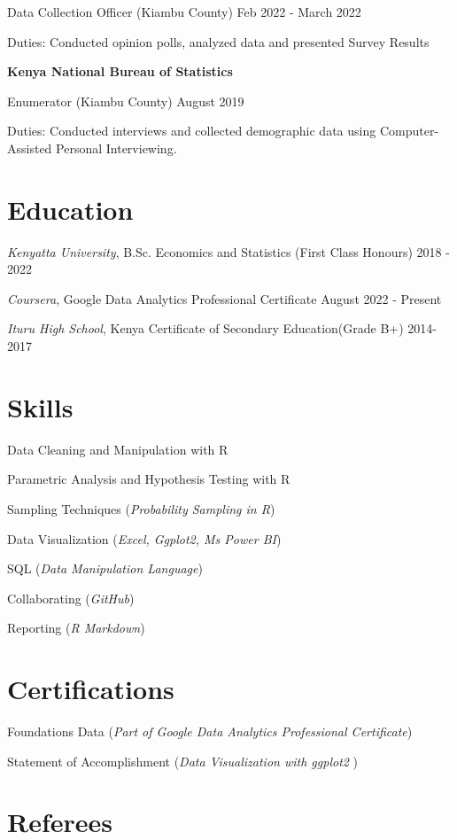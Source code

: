 \documentclass[11pt,]{article}
\begin{document}
Data Collection Officer (Kiambu County) \hfill Feb 2022 - March 2022

Duties: Conducted opinion polls, analyzed data and presented Survey
Results

\textbf{Kenya National Bureau of Statistics}

Enumerator (Kiambu County) \hfill August 2019

Duties: Conducted interviews and collected demographic data using
Computer-Assisted Personal Interviewing.

\hypertarget{education}{%
\section{Education}\label{education}}

\emph{Kenyatta University}, B.Sc. Economics and Statistics (First Class
Honours) \hfill 2018 - 2022

\emph{Coursera}, Google Data Analytics Professional Certificate
\hfill August 2022 - Present

\emph{Ituru High School}, Kenya Certificate of Secondary Education(Grade
B+) \hfill 2014-2017

\hypertarget{skills}{%
\section{Skills}\label{skills}}

Data Cleaning and Manipulation with R

Parametric Analysis and Hypothesis Testing with R

Sampling Techniques (\emph{Probability Sampling in R})

Data Visualization (\emph{Excel, Ggplot2, Ms Power BI})

SQL (\emph{Data Manipulation Language})

Collaborating (\emph{GitHub})

Reporting (\emph{R Markdown})

\hypertarget{certifications}{%
\section{Certifications}\label{certifications}}

Foundations Data (\emph{Part of Google Data Analytics Professional
Certificate})

Statement of Accomplishment (\emph{Data Visualization with ggplot2 })

\hypertarget{referees}{%
\section{Referees}\label{referees}}
\end{document}
